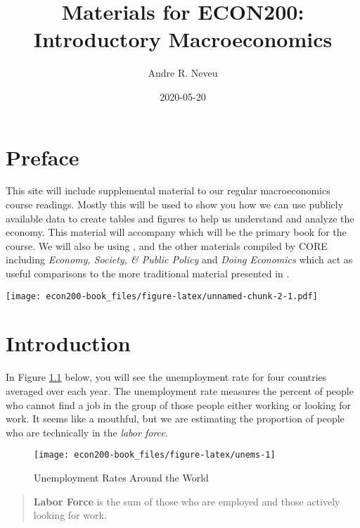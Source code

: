 \documentclass[
]{book}
\title{Materials for ECON200: Introductory Macroeconomics}
\author{Andre R. Neveu}
\date{2020-05-20}
\begin{document}
\maketitle

{
\setcounter{tocdepth}{1}
\tableofcontents
}
\hypertarget{preface}{%
\chapter*{Preface}\label{preface}}

This site will include supplemental material to our regular macroeconomics course readings. Mostly this will be used to show you how we can use publicly available data to create tables and figures to help us understand and analyze the economy. This material will accompany \citet{tw} which will be the primary book for the course. We will also be using \citet{core}, and the other materials compiled by CORE including \emph{Economy, Society, \& Public Policy} \citep{espp} and \emph{Doing Economics} \citep{doing} which act as useful comparisons to the more traditional material presented in \citet{tw}.

\texttt{[image: econ200-book\_files/figure-latex/unnamed-chunk-2-1.pdf]}

\hypertarget{intro}{%
\chapter{Introduction}\label{intro}}

In Figure \ref{fig:unems} below, you will see the unemployment rate for four countries averaged over each year. The unemployment rate measures the percent of people who cannot find a job in the group of those people either working or looking for work. It seems like a mouthful, but we are estimating the proportion of people who are technically in the \emph{labor force}.

\begin{figure}

{\centering \texttt{[image: econ200-book\_files/figure-latex/unems-1]} 

}

\caption{Unemployment Rates Around the World}\label{fig:unems}
\end{figure}

\begin{quote}
\textbf{Labor Force} is the sum of those who are employed and those actively looking for work.
\end{quote}
\end{document}

